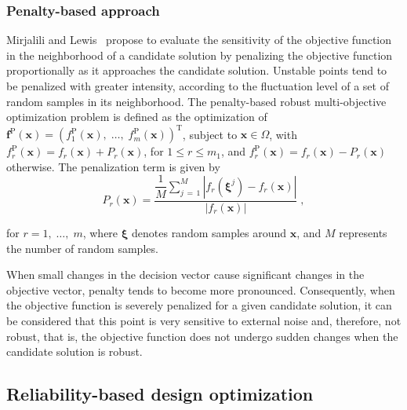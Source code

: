 \documentclass[final,5p,times,twocolumn,numbers]{elsarticle}
\newcommand{\vect}[1]{\mathbf{\boldsymbol{#1}}}
\begin{document}
\subsubsection{Penalty-based approach} \label{sec:tec_rob_penal}

Mirjalili and Lewis~\cite{bib:mirjalili2016} propose to evaluate the sensitivity of the objective function in the neighborhood of a candidate solution by penalizing the objective function proportionally as it approaches the candidate solution. Unstable points tend to be penalized with greater intensity, according to the fluctuation level of a set of random samples in its neighborhood. The penalty-based robust multi-objective optimization problem is defined as the optimization of $ \mathbf{f}^{\mathrm{P}} \left( \mathbf{x} \right) = \left( f_{1}^{\mathrm{P}} \left( \mathbf{x} \right), \; \dots, \; f_{m}^{\mathrm{P}} \left( \mathbf{x} \right) \right)^{\mathrm{T}}$, subject to $ \mathbf{x} \in \Omega $, with $ f_{r}^{\mathrm{P}} \left( \mathbf{x} \right) = f_{r} \left( \mathbf{x} \right) + P_{r} \left( \mathbf{x} \right) $, for $ 1 \leq r \leq m_{1} $, and $ f_{r}^{\mathrm{P}} \left( \mathbf{x} \right) = f_{r} \left( \mathbf{x} \right) - P_{r} \left( \mathbf{x} \right) $ otherwise. The penalization term is given by
%
\begin{equation} \label{eq:funcao_penalizacao}
P_{r} \left( \mathbf{x} \right) = \dfrac{\dfrac{1}{M} \sum\limits_{j \, = \, 1}^{M} \left\vert f_{r} \left( \vect{\xi}^{j} \right) - f_{r} \left( \mathbf{x} \right) \right\vert}{\left\vert f_{r} \left( \mathbf{x} \right) \right\vert} \; ,
\end{equation}

\noindent for $ r = 1, \; \dots, \; m $, where $ \vect{\xi} $ denotes random samples around $ \mathbf{x} $, and $ M $ represents the number of random samples.

When small changes in the decision vector cause significant changes in the objective vector, penalty tends to become more pronounced. Consequently, when the objective function is severely penalized for a given candidate solution, it can be considered that this point is very sensitive to external noise and, therefore, not robust, that is, the objective function does not undergo sudden changes when the candidate solution is robust.

\subsection{Reliability-based design optimization} \label{sec:reliability_optimization}
\end{document}
